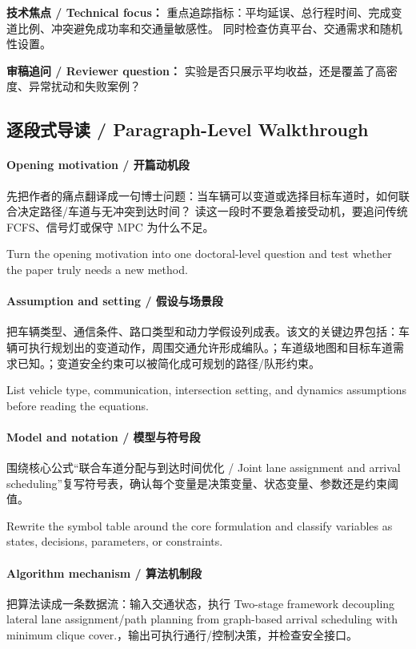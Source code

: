 \documentclass[UTF8,a4paper,11pt,fontset=fandol]{ctexart}
\begin{document}
\textbf{技术焦点 / Technical focus：} 重点追踪指标：平均延误、总行程时间、完成变道比例、冲突避免成功率和交通量敏感性。 同时检查仿真平台、交通需求和随机性设置。

\textbf{审稿追问 / Reviewer question：} 实验是否只展示平均收益，还是覆盖了高密度、异常扰动和失败案例？


\subsection{逐段式导读 / Paragraph-Level Walkthrough}
\paragraph{Opening motivation / 开篇动机段}先把作者的痛点翻译成一句博士问题：当车辆可以变道或选择目标车道时，如何联合决定路径/车道与无冲突到达时间？ 读这一段时不要急着接受动机，要追问传统 FCFS、信号灯或保守 MPC 为什么不足。

Turn the opening motivation into one doctoral-level question and test whether the paper truly needs a new method.

\paragraph{Assumption and setting / 假设与场景段}把车辆类型、通信条件、路口类型和动力学假设列成表。该文的关键边界包括：车辆可执行规划出的变道动作，周围交通允许形成编队。；车道级地图和目标车道需求已知。；变道安全约束可以被简化成可规划的路径/队形约束。

List vehicle type, communication, intersection setting, and dynamics assumptions before reading the equations.

\paragraph{Model and notation / 模型与符号段}围绕核心公式“联合车道分配与到达时间优化 / Joint lane assignment and arrival scheduling”复写符号表，确认每个变量是决策变量、状态变量、参数还是约束阈值。

Rewrite the symbol table around the core formulation and classify variables as states, decisions, parameters, or constraints.

\paragraph{Algorithm mechanism / 算法机制段}把算法读成一条数据流：输入交通状态，执行 Two-stage framework decoupling lateral lane assignment/path planning from graph-based arrival scheduling with minimum clique cover.，输出可执行通行/控制决策，并检查安全接口。
\end{document}
